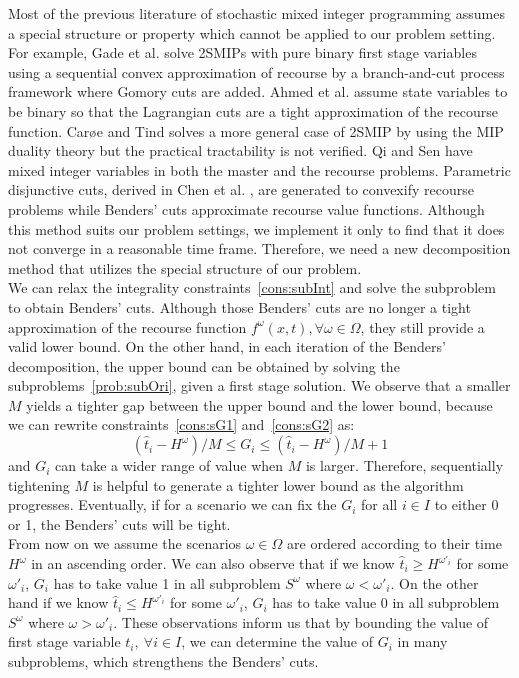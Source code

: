 \documentclass[11pt]{article}
\begin{document}
	Most of the previous literature of stochastic mixed integer programming assumes a special structure or property which cannot be applied to our problem setting. For example, Gade et al. \cite{gade2014decomposition} solve 2SMIPs with pure binary first stage variables using a sequential convex approximation of recourse by a branch-and-cut process framework where Gomory cuts are added. Ahmed et al. \cite{zou2016nested} assume state variables to be binary so that the Lagrangian cuts are a tight approximation of the recourse function. Car{\o}e and Tind \cite{caroe1998shaped} solves a more general case of 2SMIP by using the MIP duality theory but the practical tractability is not verified. Qi and Sen \cite{qi2017ancestral} have mixed integer variables in both the master and the recourse problems. Parametric disjunctive cuts, derived in Chen et al. \cite{chen2012computational}, are generated to convexify recourse problems while Benders' cuts approximate recourse value functions. Although this method suits our problem settings, we implement it only to find that it does not converge in a reasonable time frame. Therefore, we need a new decomposition method that utilizes the special structure of our problem. \\
	\newline
	We can relax the integrality constraints~\eqref{cons:subInt} and solve the subproblem to obtain Benders' cuts. Although those Benders' cuts are no longer a tight approximation of the recourse function \(f^\omega(x,t), \forall \omega \in \Omega\), they still provide a valid lower bound. On the other hand, in each iteration of the Benders' decomposition, the upper bound can be obtained by solving the subproblems~\eqref{prob:subOri}, given a first stage solution. We observe that a smaller \(M\) yields a tighter gap between the upper bound and the lower bound, because we can rewrite constraints~\eqref{cons:sG1} and~\eqref{cons:sG2} as:
	\begin{equation} \label{cons:Grange}
		(\hat{t}_i - H^\omega)/M \leq G_i \leq (\hat{t}_i - H^\omega)/M + 1
	\end{equation}
	and \(G_i\) can take a wider range of value when \(M\) is larger. Therefore, sequentially tightening \(M\) is helpful to generate a tighter lower bound as the algorithm progresses. Eventually, if for a scenario we can fix the \(G_i\) for all \(i \in I\) to either 0 or 1, the Benders' cuts will be tight.\\
	\newline
	From now on we assume the scenarios \(\omega \in \Omega\) are ordered according to their time \(H^\omega\) in an ascending order. We can also observe that if we know \(\hat{t}_i \geq H^{\omega'_i}\) for some \(\omega'_i\), \(G_i\) has to take value 1 in all subproblem \(S^\omega\) where \(\omega < \omega'_i\). On the other hand if we know \(\hat{t}_i \leq H^{\omega'_i}\) for some \(\omega'_i\), \(G_i\) has to take value 0 in all subproblem \(S^\omega\) where \(\omega > \omega'_i\). These observations inform us that by bounding the value of first stage variable \(t_i,\ \forall i \in I\), we can determine the value of \(G_i\) in many subproblems, which strengthens the Benders' cuts.\\
\end{document}
